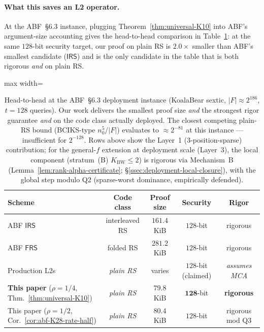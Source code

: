 \documentclass[11pt]{article}
\theoremstyle{definition}
\theoremstyle{remark}
\begin{document}
\paragraph{What this saves an L2 operator.}
At the ABF~\S 6.3 instance, plugging Theorem~\ref{thm:universal-K10}
into ABF's argument-size accounting gives the head-to-head comparison
in Table~\ref{tab:headline-comparison}: at the same $128$-bit security
target, our proof on plain RS is $\mathbf{2.0\times}$ smaller than
ABF's smallest candidate ($\mathsf{IRS}$) and is the only candidate
in the table that is both rigorous \emph{and} on plain RS.

\begin{table}[h]
\centering
\small
\begin{adjustbox}{max width=\textwidth}
\begin{tabular}{lcccc}
\toprule
Scheme & Code class & Proof size & Security & Rigor \\
\midrule
ABF $\mathsf{IRS}$~\cite{ABF} & interleaved RS & $161.4$ KiB & $128$-bit & rigorous \\
ABF $\mathsf{FRS}$~\cite{ABF} & folded RS & $281.2$ KiB & $128$-bit & rigorous \\
Production L2s & \emph{plain RS} & varies & $128$-bit (claimed) & \emph{assumes MCA} \\
\midrule
\textbf{This paper} ($\rho{=}1/4$, Thm.~\ref{thm:universal-K10}) & \emph{plain RS} & $\mathbf{79.8}$ KiB & $\mathbf{128}$-bit & \textbf{rigorous} \\
This paper ($\rho{=}1/2$, Cor.~\ref{cor:abf-K28-rate-half}) & \emph{plain RS} & $80.4$ KiB & $128$-bit & rigorous mod Q3 \\
\bottomrule
\end{tabular}
\end{adjustbox}
\caption{Head-to-head at the ABF~\S 6.3 deployment instance
(KoalaBear sextic, $|F| \approx 2^{186}$, $t = 128$ queries).
Our work delivers the smallest proof size \emph{and} the strongest
rigor guarantee \emph{and} on the code class actually deployed.
The closest competing plain-RS bound (BCIKS-type $n_0^5/|F|$)
evaluates to $\approx 2^{-81}$ at this instance --- insufficient
for $2^{-128}$. Rows above show the Layer~1 (3-position-sparse)
contribution; for the general-$f$ extension at deployment scale
(Layer~3), the local component (stratum~(B)
$K_{\mathrm{BW}} \leq 2$) is rigorous via Mechanism~B
(Lemma~\ref{lem:rank-alpha-certificate}; \S\ref{ssec:deployment-local-closure}),
with the global step modulo Q2 (sparse-worst dominance,
empirically defended).}
\label{tab:headline-comparison}
\end{table}
\end{document}
